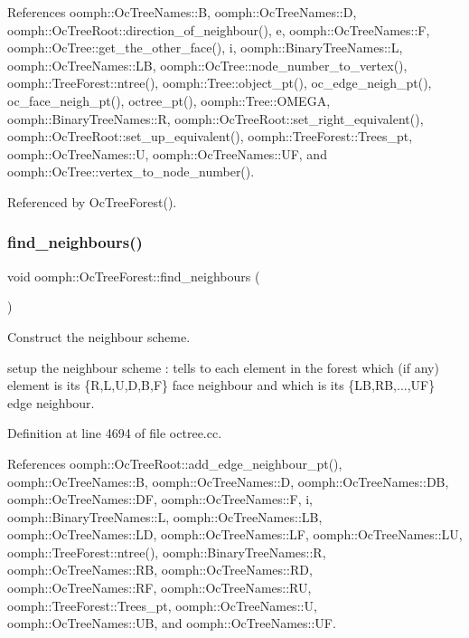 References oomph\+::\+Oc\+Tree\+Names\+::B, oomph\+::\+Oc\+Tree\+Names\+::D, oomph\+::\+Oc\+Tree\+Root\+::direction\+\_\+of\+\_\+neighbour(), e, oomph\+::\+Oc\+Tree\+Names\+::F, oomph\+::\+Oc\+Tree\+::get\+\_\+the\+\_\+other\+\_\+face(), i, oomph\+::\+Binary\+Tree\+Names\+::L, oomph\+::\+Oc\+Tree\+Names\+::\+LB, oomph\+::\+Oc\+Tree\+::node\+\_\+number\+\_\+to\+\_\+vertex(), oomph\+::\+Tree\+Forest\+::ntree(), oomph\+::\+Tree\+::object\+\_\+pt(), oc\+\_\+edge\+\_\+neigh\+\_\+pt(), oc\+\_\+face\+\_\+neigh\+\_\+pt(), octree\+\_\+pt(), oomph\+::\+Tree\+::\+O\+M\+E\+GA, oomph\+::\+Binary\+Tree\+Names\+::R, oomph\+::\+Oc\+Tree\+Root\+::set\+\_\+right\+\_\+equivalent(), oomph\+::\+Oc\+Tree\+Root\+::set\+\_\+up\+\_\+equivalent(), oomph\+::\+Tree\+Forest\+::\+Trees\+\_\+pt, oomph\+::\+Oc\+Tree\+Names\+::U, oomph\+::\+Oc\+Tree\+Names\+::\+UF, and oomph\+::\+Oc\+Tree\+::vertex\+\_\+to\+\_\+node\+\_\+number().



Referenced by Oc\+Tree\+Forest().

\mbox{\label{classoomph_1_1OcTreeForest_a2c65565b1b9c673147d96f0d8f1a500d}} 
\subsubsection{\texorpdfstring{find\+\_\+neighbours()}{find\_neighbours()}}
{\footnotesize\ttfamily void oomph\+::\+Oc\+Tree\+Forest\+::find\+\_\+neighbours (\begin{DoxyParamCaption}{ }\end{DoxyParamCaption})\hspace{0.3cm}{\ttfamily [private]}}



Construct the neighbour scheme. 

setup the neighbour scheme \+: tells to each element in the forest which (if any) element is its \{R,L,U,D,B,F\} face neighbour and which is its \{LB,RB,...,UF\} edge neighbour. 

Definition at line 4694 of file octree.\+cc.



References oomph\+::\+Oc\+Tree\+Root\+::add\+\_\+edge\+\_\+neighbour\+\_\+pt(), oomph\+::\+Oc\+Tree\+Names\+::B, oomph\+::\+Oc\+Tree\+Names\+::D, oomph\+::\+Oc\+Tree\+Names\+::\+DB, oomph\+::\+Oc\+Tree\+Names\+::\+DF, oomph\+::\+Oc\+Tree\+Names\+::F, i, oomph\+::\+Binary\+Tree\+Names\+::L, oomph\+::\+Oc\+Tree\+Names\+::\+LB, oomph\+::\+Oc\+Tree\+Names\+::\+LD, oomph\+::\+Oc\+Tree\+Names\+::\+LF, oomph\+::\+Oc\+Tree\+Names\+::\+LU, oomph\+::\+Tree\+Forest\+::ntree(), oomph\+::\+Binary\+Tree\+Names\+::R, oomph\+::\+Oc\+Tree\+Names\+::\+RB, oomph\+::\+Oc\+Tree\+Names\+::\+RD, oomph\+::\+Oc\+Tree\+Names\+::\+RF, oomph\+::\+Oc\+Tree\+Names\+::\+RU, oomph\+::\+Tree\+Forest\+::\+Trees\+\_\+pt, oomph\+::\+Oc\+Tree\+Names\+::U, oomph\+::\+Oc\+Tree\+Names\+::\+UB, and oomph\+::\+Oc\+Tree\+Names\+::\+UF.




